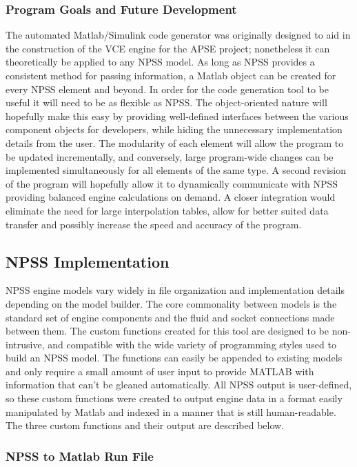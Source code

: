 \documentclass[heading.tex]{subfiles}
\begin{document}
\subsubsection{Program Goals and Future Development}

The automated Matlab/Simulink code generator was originally designed to aid in the construction of
the VCE engine for the APSE project; nonetheless it can theoretically be applied to any NPSS
model. As long as NPSS provides a consistent method for passing information, a Matlab object can
be created for every NPSS element and beyond. In order for the code generation tool to be useful
it will need to be as flexible as NPSS. The object-oriented nature will hopefully make this easy
by providing well-defined interfaces between the various component objects for developers, while
hiding the unnecessary implementation details from the user. The modularity of each element will
allow the program to be updated incrementally, and conversely, large program-wide changes can be
implemented simultaneously for all elements of the same type. 
	A second revision of the program will hopefully allow it to dynamically communicate with NPSS
providing balanced engine calculations on demand. A closer integration would eliminate the need
for large interpolation tables, allow for better suited data transfer and possibly increase the
speed and accuracy of the program.

\subsection{NPSS Implementation}

NPSS engine models vary widely in file organization and implementation details depending on the
model builder. The core commonality between models is the standard set of engine components and
the fluid and socket connections made between them. The custom functions created for this tool are
designed to be non-intrusive, and compatible with the wide variety of programming styles used to
build an NPSS model. The functions can easily be appended to existing models and only require a
small amount of user input to provide MATLAB with information that can’t be gleaned automatically.
All NPSS output is user-defined, so these custom functions were created to output engine data in a
format easily manipulated by Matlab and indexed in a manner that is still human-readable. The
three custom functions and their output are described below.

\subsubsection{NPSS to Matlab Run File}
\end{document}
